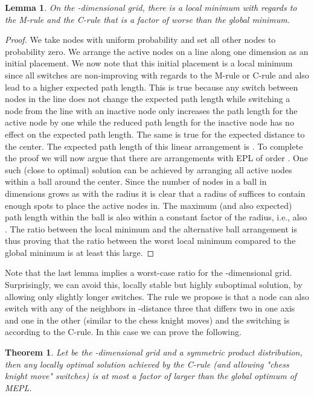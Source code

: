 \documentclass[conference]{IEEEtran}
\newtheorem{theorem}{Theorem}
\newtheorem{lemma}{Lemma}
\begin{document}
\begin{lemma}
On the -dimensional grid, there is a local minimum with regards to the M-rule and the C-rule that is a factor of  worse than the global minimum.
\end{lemma}
\begin{proof}
We take  nodes with uniform probability  and set all other nodes to probability zero. We arrange the active nodes on a line along one dimension as an initial placement. We now note that this initial placement is a local minimum since all switches are non-improving with regards to the M-rule or C-rule and also lead to a higher expected path length. This is true because any switch between nodes in the line does not change the expected path length while switching a node from the line with an inactive node only increases the path length for the active node by one while the reduced path length for the inactive node has no effect on the expected path length. The same is true for the expected distance to the center. The expected path length of this linear arrangement is . To complete the proof we will now argue that there are arrangements with EPL of order . One such (close to optimal) solution can be achieved by arranging all active nodes within a ball around the center. Since the number of nodes in a ball in  dimensions grows as  with the radius  it is clear that a radius of  suffices to contain enough spots to place the  active nodes in. The maximum (and also expected) path length within the ball is also within a constant factor of the radius, i.e., also . The ratio between the local minimum and the alternative ball arrangement is thus  proving that the ratio between the worst local minimum compared to the global minimum is at least this large. 
\end{proof}





Note that the last lemma implies a  worst-case ratio for the -dimensional grid. Surprisingly, we can avoid this, locally stable but highly suboptimal solution, by allowing only slightly longer switches. The rule we propose is that a node can also switch with any of the neighbors in -distance three that differs two in one axis and one in the other (similar to the chess knight moves) and the switching is according to the C-rule. In this case we can prove the following.

\begin{theorem}\label{thm:approx-grid}
Let  be the -dimensional grid and  a symmetric product distribution, then any locally optimal solution achieved by the C-rule (and allowing "chess knight move" switches) is at most a factor of  larger than the global optimum of MEPL.
\end{theorem}
\end{document}
